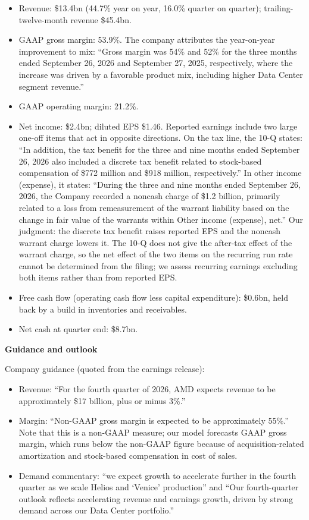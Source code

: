 \documentclass[a4paper,10pt]{article}
\begin{document}
\begin{itemize}\setlength{\itemsep}{1pt}
\item Revenue: \$13.4bn (44.7\% year on year, 16.0\% quarter on quarter); trailing-twelve-month revenue \$45.4bn.
\item GAAP gross margin: 53.9\%. The company attributes the year-on-year improvement to mix: “Gross margin was 54\% and 52\% for the three months ended September 26, 2026 and September 27, 2025, respectively, where the increase was driven by a favorable product mix, including higher Data Center segment revenue.”
\item GAAP operating margin: 21.2\%.
\item Net income: \$2.4bn; diluted EPS \$1.46. Reported earnings include two large one-off items that act in opposite directions. On the tax line, the 10-Q states: “In addition, the tax benefit for the three and nine months ended September 26, 2026 also included a discrete tax benefit related to stock-based compensation of \$772 million and \$918 million, respectively.” In other income (expense), it states: “During the three and nine months ended September 26, 2026, the Company recorded a noncash charge of \$1.2 billion, primarily related to a loss from remeasurement of the warrant liability based on the change in fair value of the warrants within Other income (expense), net.” Our judgment: the discrete tax benefit raises reported EPS and the noncash warrant charge lowers it. The 10-Q does not give the after-tax effect of the warrant charge, so the net effect of the two items on the recurring run rate cannot be determined from the filing; we assess recurring earnings excluding both items rather than from reported EPS.
\item Free cash flow (operating cash flow less capital expenditure): \$0.6bn, held back by a build in inventories and receivables.
\item Net cash at quarter end: \$8.7bn.
\end{itemize}

\par\smallskip\textbf{\color{MemoBlue}Guidance and outlook}\par

Company guidance (quoted from the earnings release):

\begin{itemize}\setlength{\itemsep}{1pt}
\item Revenue: “For the fourth quarter of 2026, AMD expects revenue to be approximately \$17 billion, plus or minus 3\%.”
\item Margin: “Non-GAAP gross margin is expected to be approximately 55\%.” Note that this is a non-GAAP measure; our model forecasts GAAP gross margin, which runs below the non-GAAP figure because of acquisition-related amortization and stock-based compensation in cost of sales.
\item Demand commentary: “we expect growth to accelerate further in the fourth quarter as we scale Helios and ‘Venice’ production” and “Our fourth-quarter outlook reflects accelerating revenue and earnings growth, driven by strong demand across our Data Center portfolio.”
\end{itemize}
\end{document}
